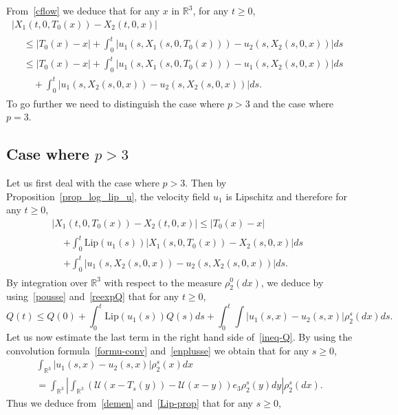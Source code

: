 \documentclass[10pt]{amsart}
\theoremstyle{definition}\newtheorem{defi}[theo]{Definition}\newtheorem{rema}[theo]{Remark}\newtheorem{exam}[theo]{Example}\newtheorem{exem}[theo]{Example}\newtheorem{nota}[theo]{Notation}
\newcommand{\Lip}{\mathrm{Lip}}
\newcommand{\R}{\mathbb{R}}
\newcommand{\clU}{\mathcal{U}}
\renewcommand{\leq}{\leqslant}
\renewcommand{\geq}{\geqslant}
\begin{document}
From~\eqref{cflow} we deduce that for any $x$ in $\R^3$, for any $t\geq 0$,
\begin{multline}\label{esti-arep}
| X_1(t,0,T_0 (x)) -X_2(t,0,x)| \\
\begin{aligned}
&\leq |T_0 (x)- x| + \int_0^t \big|u_1(s,{X}_1(s,0,T_0 (x))) -u_2(s,{X}_2(s,0,x))\big| ds\\ 
 & \leq |T_0 (x)- x| + \int_0^t \big|u_1(s,{X}_1(s,0,T_0 (x))) -u_1(s,{X}_2(s,0,x))\big| ds\\ 
& \quad + \int_0^t \big|u_1(s,{X}_2(s,0,x)) -u_2(s,{X}_2(s,0,x))\big| ds.
\end{aligned}
\end{multline}
To go further we need to distinguish the case where $p> 3$ and the case where $p=3$.
\subsection{Case where \texorpdfstring{$p> 3$}{p>3}} Let us first deal with the case where $p> 3$. Then by Proposition~\ref{prop_log_lip_u}, the velocity field $u_1$ is Lipschitz and therefore for any $t\geq 0$,
\begin{multline*}
\big| X_1(t,0,T_0 (x)) -X_2(t,0,x)\big|  \leq |T_0 (x)- x|\\
\begin{aligned}
&+ \int_0^t \Lip(u_1(s)) \big|{X}_1(s,0,T_0 (x)) -{X}_2(s,0,x)\big| ds\\
&+ \int_0^t \big|u_1(s,{X}_2(s,0,x)) -u_2(s,{X}_2(s,0,x))\big| ds.
\end{aligned}
\end{multline*}
By integration over $\R^3$ with respect to the measure $\rho_2^0(dx)$, we deduce by using~\eqref{pousse} and~\eqref{reexpQ} that for any $t\geq 0$,
\begin{equation}\label{ineq-Q}
Q(t) \leq Q(0) + \int_0^t \Lip(u_1(s)) Q(s) ds+ \int_0^t \int |u_1(s,x) -u_2(s,x)| \rho_2^s(dx) ds.
\end{equation}
Let us now estimate the last term in the right hand side of~\eqref{ineq-Q}. By using the convolution formula~\eqref{formu-conv} and~\eqref{enplusse} we obtain that for any $s\geq 0$,
\begin{multline}\label{demen}
\int_{\R^3} |u_1(s,x)-u_2(s,x)| \rho^s_2(x)dx  \\ =\int_{\R^3} \left| \int_{\R^3}(\clU(x-T_s (y)) - \clU(x-y))e_3\rho_2^s(y)dy \right| \rho_2^s(dx).
\end{multline}
Thus we deduce from~\eqref{demen} and~\eqref{Lip-prop} that for any $s\geq 0$,
\end{document}
